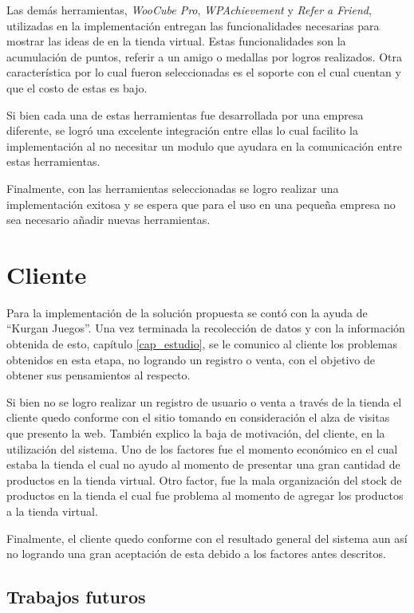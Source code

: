 Las demás herramientas, \emph{WooCube Pro}, \emph{WPAchievement} y \emph{Refer a Friend}, utilizadas en la 
implementación entregan las funcionalidades necesarias para mostrar las ideas de {\gam} en la tienda virtual. Estas funcionalidades son la acumulación de puntos, referir a un amigo o medallas por logros realizados. Otra característica por
lo cual fueron seleccionadas es el soporte con el cual cuentan y que el costo de estas es bajo.

Si bien cada una de estas herramientas fue desarrollada por una empresa diferente, se logró una excelente
integración entre ellas lo cual facilito la implementación al no necesitar un modulo que ayudara en la comunicación
entre estas herramientas.

Finalmente, con las herramientas seleccionadas se logro realizar una implementación exitosa y se espera que para
el uso en una pequeña empresa no sea necesario añadir nuevas herramientas.

\section{Cliente}

Para la implementación de la solución propuesta se contó con la ayuda de ``Kurgan Juegos''. Una vez terminada
la recolección de datos y con la información obtenida de esto, capítulo \ref{cap_estudio}, se le comunico
al cliente los problemas obtenidos en esta etapa, no logrando un registro o venta, con el objetivo de obtener
sus pensamientos al respecto.

Si bien no se logro realizar un registro de usuario o venta a través de la tienda el cliente quedo conforme con
el sitio tomando en consideración el alza de visitas que presento la web. También explico la baja de motivación,
del cliente, en la utilización del sistema. Uno de los factores fue el momento económico en el cual estaba la tienda
el cual no ayudo al momento de presentar una gran cantidad de productos en la tienda virtual. Otro factor, fue la
mala organización del stock de productos en la tienda el cual fue problema al momento de agregar los productos
a la tienda virtual.

Finalmente, el cliente quedo conforme con el resultado general del sistema aun así no logrando una gran aceptación 
de esta debido a los factores antes descritos.

\subsection{Trabajos futuros}

